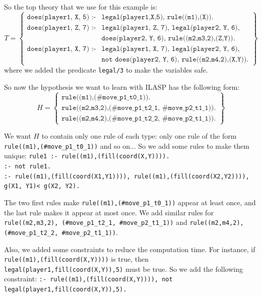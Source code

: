 \documentclass[12pt,twoside]{report}
\begin{document}
So the top theory that we use for this example is:
\[ T=
\begin{Bmatrix}
\texttt{does(player1, X, 5) :-} & \texttt{legal(player1,X,5), rule((m1),(X)).} \\ 

\texttt{does(player1, Z, 7) :-} & \texttt{legal(player1, Z, 7), legal(player2, Y, 6), }\\ 
 & \texttt{does(player2, Y, 6), rule((m2,m3,2),(Z,Y)).} \\

\texttt{does(player1, X, 7) :-} & \texttt{legal(player1, X, 7), legal(player2, Y, 6), } \\
& \texttt{not does(player2, Y, 6), rule((m2,m4,2),(X,Y)).}
\end{Bmatrix}
\]
where we added the predicate \texttt{legal/3} to make the variables safe.

\bigskip

So now the hypothesis we want to learn with ILASP has the following form:
\[H=
\begin{Bmatrix}
\texttt{rule((m1),(\#move\_p1\_t0\_1)).}\\
\texttt{rule((m2,m3,2),(\#move\_p1\_t2\_1, \#move\_p2\_t1\_1))}.\\
\texttt{rule((m2,m4,2),(\#move\_p1\_t2\_2, \#move\_p2\_t1\_1))}.
\end{Bmatrix}
\]

\bigskip

We want $H$ to contain only one rule of each type: only one rule of the form\\ \texttt{rule((m1),(\#move\_p1\_t0\_1))} and so on... 
So we add some rules to make them unique:\newline
\texttt{rule1 :- rule((m1),(fill(coord(X,Y)))).}\\
\texttt{:- not rule1.}\\
\texttt{:- rule((m1),(fill(coord(X1,Y1)))), rule((m1),(fill(coord(X2,Y2)))), g(X1, Y1)< g(X2, Y2). }\\

\smallskip

The two first rules make \texttt{rule((m1),(\#move\_p1\_t0\_1))} appear at least once, and the last rule makes it appear at most once. We add similar rules for \texttt{rule((m2,m3,2), (\#move\_p1\_t2\_1, \#move\_p2\_t1\_1))} and \texttt{rule((m2,m4,2), (\#move\_p1\_t2\_2, \#move\_p2\_t1\_1))}.

\bigskip

Also, we added some constraints to reduce the computation time. For instance, if \texttt{rule((m1),(fill(coord(X,Y))))} is true, then \texttt{legal(player1,fill(coord(X,Y)),5)} must be true. So we add the following constraint:\newline
\texttt{:- rule((m1),(fill(coord(X,Y)))), not legal(player1,fill(coord(X,Y)),5).}
\end{document}
